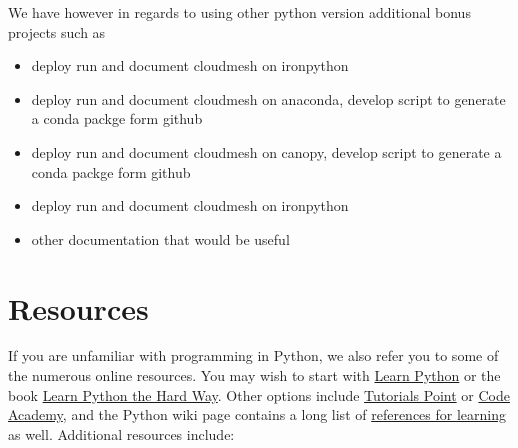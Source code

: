 We have however in regards to using other python version additional
bonus projects such as

\begin{itemize}
\tightlist
\item
  deploy run and document cloudmesh on ironpython
\item
  deploy run and document cloudmesh on anaconda, develop script to
  generate a conda packge form github
\item
  deploy run and document cloudmesh on canopy, develop script to
  generate a conda packge form github
\item
  deploy run and document cloudmesh on ironpython
\item
  other documentation that would be useful
\end{itemize}


\section{Resources}\label{resources}

If you are unfamiliar with programming in Python, we also refer you to
some of the numerous online resources. You may wish to start with
\href{https://www.learnpython.org}{Learn Python} or the book
\href{http://learnpythonthehardway.org/book/}{Learn Python the Hard
Way}. Other options include
\href{http://www.tutorialspoint.com/python/}{Tutorials Point} or
\href{http://www.codecademy.com/en/tracks/python}{Code Academy}, and the
Python wiki page contains a long list of
\href{https://wiki.python.org/moin/BeginnersGuide/Programmers}{references
for learning} as well. Additional resources include:

